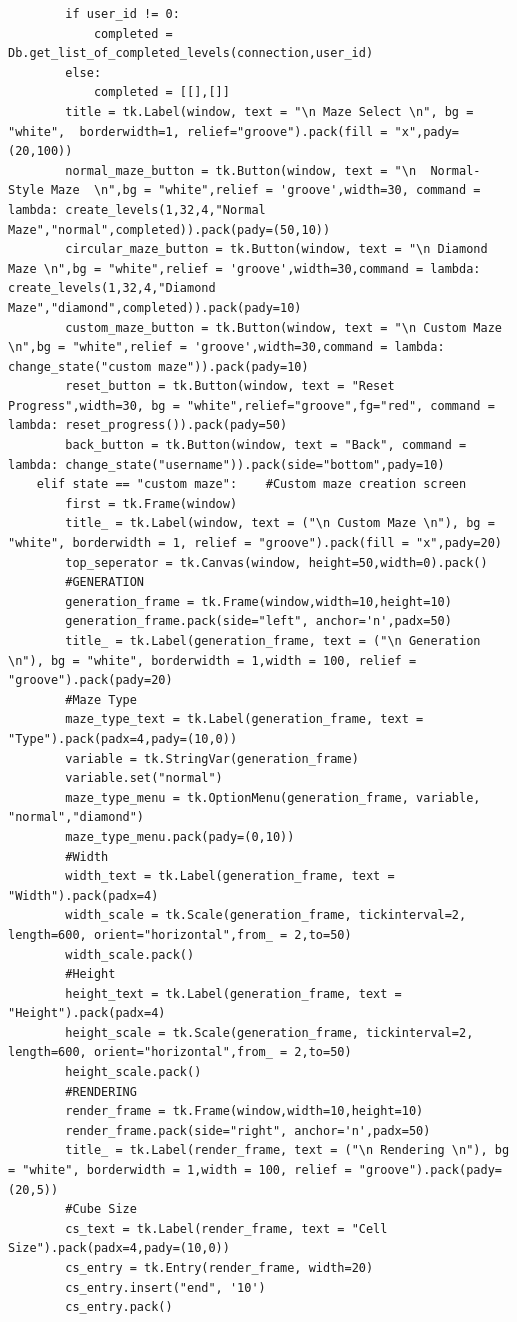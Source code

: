 \documentclass{article}
\begin{document}
\begin{lstlisting}
        if user_id != 0:
            completed = Db.get_list_of_completed_levels(connection,user_id)
        else:
            completed = [[],[]]
        title = tk.Label(window, text = "\n Maze Select \n", bg = "white",  borderwidth=1, relief="groove").pack(fill = "x",pady=(20,100))
        normal_maze_button = tk.Button(window, text = "\n  Normal-Style Maze  \n",bg = "white",relief = 'groove',width=30, command = lambda: create_levels(1,32,4,"Normal Maze","normal",completed)).pack(pady=(50,10))
        circular_maze_button = tk.Button(window, text = "\n Diamond Maze \n",bg = "white",relief = 'groove',width=30,command = lambda: create_levels(1,32,4,"Diamond Maze","diamond",completed)).pack(pady=10)
        custom_maze_button = tk.Button(window, text = "\n Custom Maze \n",bg = "white",relief = 'groove',width=30,command = lambda: change_state("custom maze")).pack(pady=10)
        reset_button = tk.Button(window, text = "Reset Progress",width=30, bg = "white",relief="groove",fg="red", command =  lambda: reset_progress()).pack(pady=50)        
        back_button = tk.Button(window, text = "Back", command = lambda: change_state("username")).pack(side="bottom",pady=10)      
    elif state == "custom maze":    #Custom maze creation screen
        first = tk.Frame(window)
        title_ = tk.Label(window, text = ("\n Custom Maze \n"), bg = "white", borderwidth = 1, relief = "groove").pack(fill = "x",pady=20)
        top_seperator = tk.Canvas(window, height=50,width=0).pack()
        #GENERATION
        generation_frame = tk.Frame(window,width=10,height=10)
        generation_frame.pack(side="left", anchor='n',padx=50)
        title_ = tk.Label(generation_frame, text = ("\n Generation \n"), bg = "white", borderwidth = 1,width = 100, relief = "groove").pack(pady=20)
        #Maze Type 
        maze_type_text = tk.Label(generation_frame, text = "Type").pack(padx=4,pady=(10,0))
        variable = tk.StringVar(generation_frame)
        variable.set("normal")
        maze_type_menu = tk.OptionMenu(generation_frame, variable, "normal","diamond")
        maze_type_menu.pack(pady=(0,10))
        #Width
        width_text = tk.Label(generation_frame, text = "Width").pack(padx=4)
        width_scale = tk.Scale(generation_frame, tickinterval=2, length=600, orient="horizontal",from_ = 2,to=50)
        width_scale.pack()
        #Height
        height_text = tk.Label(generation_frame, text = "Height").pack(padx=4)
        height_scale = tk.Scale(generation_frame, tickinterval=2, length=600, orient="horizontal",from_ = 2,to=50)
        height_scale.pack()
        #RENDERING
        render_frame = tk.Frame(window,width=10,height=10)
        render_frame.pack(side="right", anchor='n',padx=50)
        title_ = tk.Label(render_frame, text = ("\n Rendering \n"), bg = "white", borderwidth = 1,width = 100, relief = "groove").pack(pady=(20,5))
        #Cube Size
        cs_text = tk.Label(render_frame, text = "Cell Size").pack(padx=4,pady=(10,0))
        cs_entry = tk.Entry(render_frame, width=20)
        cs_entry.insert("end", '10')
        cs_entry.pack()
              

\end{lstlisting}
\end{document}
